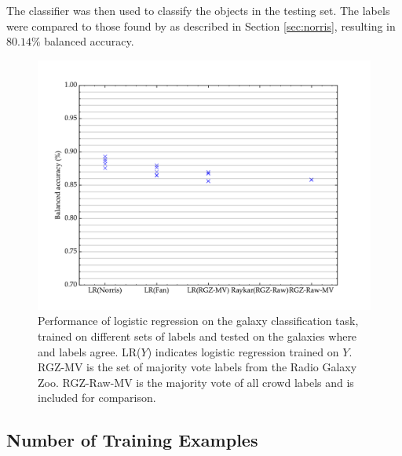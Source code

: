     The classifier was then used to classify the objects in the testing set. The labels were compared to those found by \citet{norris06} as described in Section \ref{sec:norris}, resulting in $80.14\%$ balanced accuracy.


    \begin{figure}[!ht]
      \centering
      \includegraphics[width=\textwidth]{images/experiments/predictors.pdf}
      \caption{Performance of logistic regression on the galaxy classification task, trained on different sets of labels and tested on the galaxies where \citeauthor{norris06} and \citeauthor{fan15} labels agree. LR($Y$) indicates logistic regression trained on $Y$. RGZ-MV is the set of majority vote labels from the Radio Galaxy Zoo. RGZ-Raw-MV is the majority vote of all crowd labels and is included for comparison.}
    \end{figure}

  \subsection{Number of Training Examples}


